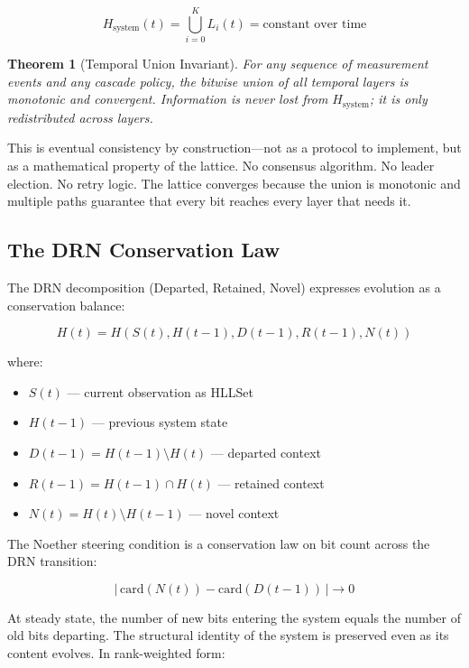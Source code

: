 \documentclass[11pt,a4paper]{article}
\newtheorem{theorem}{Theorem}[section]
\theoremstyle{remark}
\begin{document}
\begin{equation}
  H_{\text{system}}(t) = \bigcup_{i=0}^{K} L_i(t) = \text{constant over time}
\end{equation}

\begin{theorem}[Temporal Union Invariant]
For any sequence of measurement events and any cascade policy, the bitwise union of all
temporal layers is monotonic and convergent. Information is never lost from
$H_{\text{system}}$; it is only redistributed across layers.
\end{theorem}

This is eventual consistency by construction---not as a protocol to implement, but as a
mathematical property of the lattice. No consensus algorithm. No leader election. No
retry logic. The lattice converges because the union is monotonic and multiple paths
guarantee that every bit reaches every layer that needs it.

\subsection{The DRN Conservation Law}

The DRN decomposition (Departed, Retained, Novel) expresses evolution as a conservation
balance:

\begin{equation}
  H(t) = H(S(t), H(t-1), D(t-1), R(t-1), N(t))
\end{equation}

where:
\begin{itemize}[leftmargin=*,nosep]
  \item $S(t)$ --- current observation as HLLSet
  \item $H(t-1)$ --- previous system state
  \item $D(t-1) = H(t-1) \setminus H(t)$ --- departed context
  \item $R(t-1) = H(t-1) \cap H(t)$ --- retained context
  \item $N(t) = H(t) \setminus H(t-1)$ --- novel context
\end{itemize}

The Noether steering condition is a conservation law on bit count across the DRN
transition:

\begin{equation}
  |\,\text{card}(N(t)) - \text{card}(D(t-1))\,| \to 0
\end{equation}

At steady state, the number of new bits entering the system equals the number of old
bits departing. The structural identity of the system is preserved even as its content
evolves. In rank-weighted form:
\end{document}

